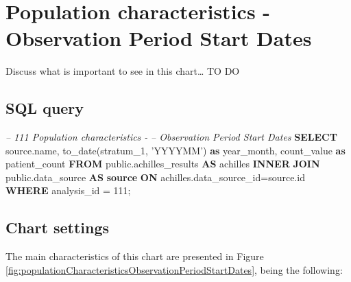 \documentclass[]{book}
\newenvironment{Shaded}{\begin{snugshade}}{\end{snugshade}}
\newcommand{\KeywordTok}[1]{\textcolor[rgb]{0.13,0.29,0.53}{\textbf{#1}}}
\newcommand{\DecValTok}[1]{\textcolor[rgb]{0.00,0.00,0.81}{#1}}
\newcommand{\StringTok}[1]{\textcolor[rgb]{0.31,0.60,0.02}{#1}}
\newcommand{\CommentTok}[1]{\textcolor[rgb]{0.56,0.35,0.01}{\textit{#1}}}
\newcommand{\FunctionTok}[1]{\textcolor[rgb]{0.00,0.00,0.00}{#1}}
\newcommand{\NormalTok}[1]{#1}
\begin{document}
\section{Population characteristics - Observation Period Start
Dates}\label{population-characteristics---observation-period-start-dates}

Discuss what is important to see in this chart\ldots{} TO DO

\subsection{SQL query}\label{sql-query-12}

\begin{Shaded}
\begin{Highlighting}[]
\CommentTok{-- 111  Population characteristics - }
\CommentTok{--      Observation Period Start Dates}
\KeywordTok{SELECT}\NormalTok{ source.name,}
       \FunctionTok{to_date}\NormalTok{(stratum_1, }\StringTok{'YYYYMM'}\NormalTok{) }\KeywordTok{as}\NormalTok{ year_month,}
\NormalTok{       count_value }\KeywordTok{as}\NormalTok{ patient_count}
\KeywordTok{FROM}\NormalTok{ public.achilles_results }\KeywordTok{AS}\NormalTok{ achilles }
    \KeywordTok{INNER} \KeywordTok{JOIN}\NormalTok{ public.data_source }\KeywordTok{AS} \KeywordTok{source} \KeywordTok{ON} 
\NormalTok{      achilles.data_source_id=source.id}
\KeywordTok{WHERE}\NormalTok{ analysis_id = }\DecValTok{111}\NormalTok{;}
\end{Highlighting}
\end{Shaded}

\subsection{Chart settings}\label{chart-settings-12}

The main characteristics of this chart are presented in Figure
\ref{fig:populationCharacteristicsObservationPeriodStartDates}, being
the following:
\end{document}
